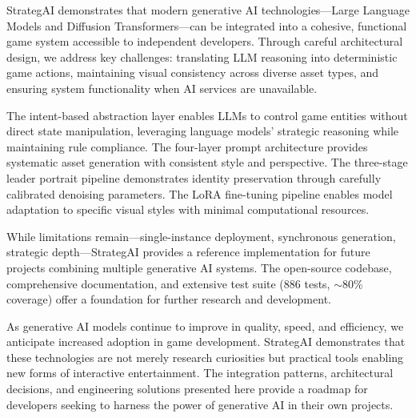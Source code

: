 \documentclass[conference]{IEEEtran}
\begin{document}
StrategAI demonstrates that modern generative AI technologies---Large Language Models and Diffusion Transformers---can be integrated into a cohesive, functional game system accessible to independent developers. Through careful architectural design, we address key challenges: translating LLM reasoning into deterministic game actions, maintaining visual consistency across diverse asset types, and ensuring system functionality when AI services are unavailable.

The intent-based abstraction layer enables LLMs to control game entities without direct state manipulation, leveraging language models' strategic reasoning while maintaining rule compliance. The four-layer prompt architecture provides systematic asset generation with consistent style and perspective. The three-stage leader portrait pipeline demonstrates identity preservation through carefully calibrated denoising parameters. The LoRA fine-tuning pipeline enables model adaptation to specific visual styles with minimal computational resources.

While limitations remain---single-instance deployment, synchronous generation, strategic depth---StrategAI provides a reference implementation for future projects combining multiple generative AI systems. The open-source codebase, comprehensive documentation, and extensive test suite (886 tests, $\sim$80\% coverage) offer a foundation for further research and development.

As generative AI models continue to improve in quality, speed, and efficiency, we anticipate increased adoption in game development. StrategAI demonstrates that these technologies are not merely research curiosities but practical tools enabling new forms of interactive entertainment. The integration patterns, architectural decisions, and engineering solutions presented here provide a roadmap for developers seeking to harness the power of generative AI in their own projects.
\end{document}
